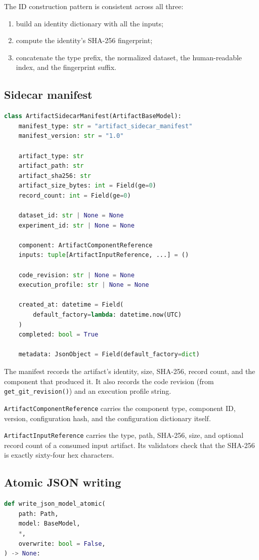 \documentclass[11pt,a4paper]{article}
\begin{document}
The ID construction pattern is consistent across all three:
\begin{enumerate}[leftmargin=1.5em,itemsep=0.15em]
  \item build an identity dictionary with all the inputs;
  \item compute the identity's SHA-256 fingerprint;
  \item concatenate the type prefix, the normalized dataset, the
    human-readable index, and the fingerprint suffix.
\end{enumerate}

\subsection{Sidecar manifest}
\begin{lstlisting}[language=python]
class ArtifactSidecarManifest(ArtifactBaseModel):
    manifest_type: str = "artifact_sidecar_manifest"
    manifest_version: str = "1.0"

    artifact_type: str
    artifact_path: str
    artifact_sha256: str
    artifact_size_bytes: int = Field(ge=0)
    record_count: int = Field(ge=0)

    dataset_id: str | None = None
    experiment_id: str | None = None

    component: ArtifactComponentReference
    inputs: tuple[ArtifactInputReference, ...] = ()

    code_revision: str | None = None
    execution_profile: str | None = None

    created_at: datetime = Field(
        default_factory=lambda: datetime.now(UTC)
    )
    completed: bool = True

    metadata: JsonObject = Field(default_factory=dict)
\end{lstlisting}

The manifest records the artifact's identity, size, SHA-256,
record count, and the component that produced it. It also records
the code revision (from \texttt{get\_git\_revision()}) and an
execution profile string.

\texttt{ArtifactComponentReference} carries the component type,
component ID, version, configuration hash, and the configuration
dictionary itself.

\texttt{ArtifactInputReference} carries the type, path, SHA-256,
size, and optional record count of a consumed input artifact. Its
validators check that the SHA-256 is exactly sixty-four hex
characters.

\subsection{Atomic JSON writing}
\begin{lstlisting}[language=python]
def write_json_model_atomic(
    path: Path,
    model: BaseModel,
    *,
    overwrite: bool = False,
) -> None:
\end{lstlisting}
\end{document}
